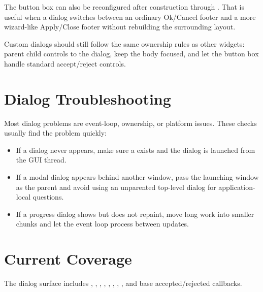 The button box can also be reconfigured after construction through . That is useful when a dialog switches between an ordinary Ok/Cancel footer and a more wizard-like Apply/Close footer without rebuilding the surrounding layout.

Custom dialogs should still follow the same ownership rules as other widgets: parent child controls to the dialog, keep the body focused, and let the button box handle standard accept/reject controls.

\section{Dialog Troubleshooting}

Most dialog problems are event-loop, ownership, or platform issues. These checks usually find the problem quickly:

\begin{itemize}
\item If a dialog never appears, make sure a  exists and the dialog is launched from the GUI thread.
\item If a modal dialog appears behind another window, pass the launching window as the parent and avoid using an unparented top-level dialog for application-local questions.
\item If a progress dialog shows but does not repaint, move long work into smaller chunks and let the event loop process between updates.
\end{itemize}

\section{Current Coverage}

The dialog surface includes , , , , , , , , and base  accepted/rejected callbacks.
